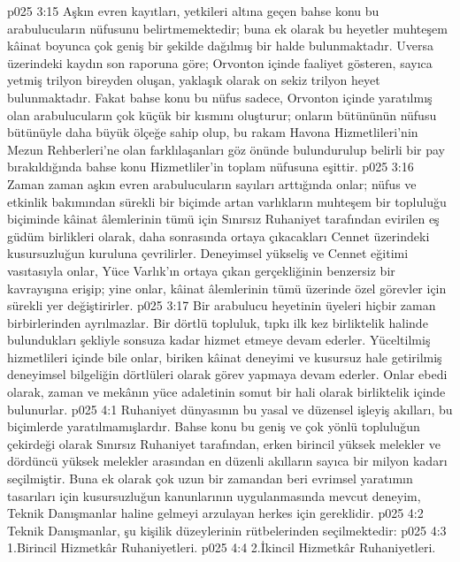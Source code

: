 \vs p025 3:15 Aşkın evren kayıtları, yetkileri altına geçen bahse konu bu arabulucuların nüfusunu belirtmemektedir; buna ek olarak bu heyetler muhteşem kâinat boyunca çok geniş bir şekilde dağılmış bir halde bulunmaktadır. Uversa üzerindeki kaydın son raporuna göre; Orvonton içinde faaliyet gösteren, sayıca yetmiş trilyon bireyden oluşan, yaklaşık olarak on sekiz trilyon heyet bulunmaktadır. Fakat bahse konu bu nüfus sadece, Orvonton içinde yaratılmış olan arabulucuların çok küçük bir kısmını oluşturur; onların bütününün nüfusu bütünüyle daha büyük ölçeğe sahip olup, bu rakam Havona Hizmetlileri’nin Mezun Rehberleri’ne olan farklılaşanları göz önünde bulundurulup belirli bir pay bırakıldığında bahse konu Hizmetliler’in toplam nüfusuna eşittir.
\vs p025 3:16 Zaman zaman aşkın evren arabulucuların sayıları arttığında onlar; nüfus ve etkinlik bakımından sürekli bir biçimde artan varlıkların muhteşem bir topluluğu biçiminde kâinat âlemlerinin tümü için Sınırsız Ruhaniyet tarafından evirilen eş güdüm birlikleri olarak, daha sonrasında ortaya çıkacakları Cennet üzerindeki kusursuzluğun kuruluna çevrilirler. Deneyimsel yükseliş ve Cennet eğitimi vasıtasıyla onlar, Yüce Varlık’ın ortaya çıkan gerçekliğinin benzersiz bir kavrayışına erişip; yine onlar, kâinat âlemlerinin tümü üzerinde özel görevler için sürekli yer değiştirirler.
\vs p025 3:17 Bir arabulucu heyetinin üyeleri hiçbir zaman birbirlerinden ayrılmazlar. Bir dörtlü topluluk, tıpkı ilk kez birliktelik halinde bulundukları şekliyle sonsuza kadar hizmet etmeye devam ederler. Yüceltilmiş hizmetlileri içinde bile onlar, biriken kâinat deneyimi ve kusursuz hale getirilmiş deneyimsel bilgeliğin dörtlüleri olarak görev yapmaya devam ederler. Onlar ebedi olarak, zaman ve mekânın yüce adaletinin somut bir hali olarak birliktelik içinde bulunurlar.
\vs p025 4:1 Ruhaniyet dünyasının bu yasal ve düzensel işleyiş akılları, bu biçimlerde yaratılmamışlardır. Bahse konu bu geniş ve çok yönlü topluluğun çekirdeği olarak Sınırsız Ruhaniyet tarafından, erken birincil yüksek melekler ve dördüncü yüksek melekler arasından en düzenli akılların sayıca bir milyon kadarı seçilmiştir. Buna ek olarak çok uzun bir zamandan beri evrimsel yaratımın tasarıları için kusursuzluğun kanunlarının uygulanmasında mevcut deneyim, Teknik Danışmanlar haline gelmeyi arzulayan herkes için gereklidir.
\vs p025 4:2 Teknik Danışmanlar, şu kişilik düzeylerinin rütbelerinden seçilmektedir:
\vs p025 4:3 1.\bibnobreakspace Birincil Hizmetkâr Ruhaniyetleri.
\vs p025 4:4 2.\bibnobreakspace İkincil Hizmetkâr Ruhaniyetleri.
